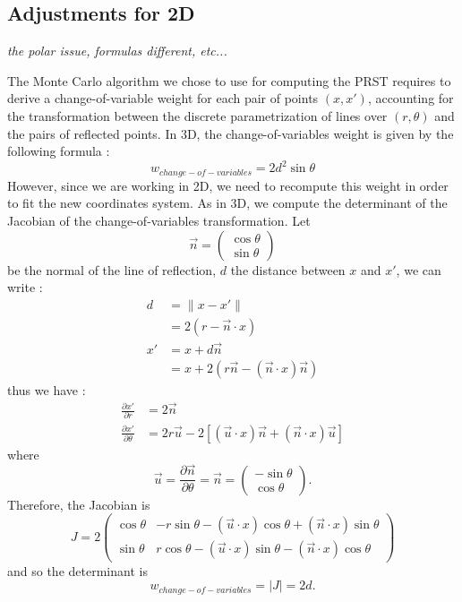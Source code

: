 \documentclass[10pt,a4paper]{article}			%
\begin{document}
	\subsection{Adjustments for 2D}
	
\textit{	the polar issue, formulas different, etc...\\}

The Monte Carlo algorithm we chose to use for computing the PRST requires to derive a change-of-variable weight for each pair of points $(x,x')$, accounting for the transformation between the discrete parametrization of lines over $(r,\theta)$ and the pairs of reflected points. In 3D, the change-of-variables weight is given by the following formula :
\[w_{change-of-variables} = 2d^2\sin\theta\]
However, since we are working in 2D, we need to recompute this weight in order to fit the new coordinates system. As in 3D, we compute the determinant of the Jacobian of the change-of-variables transformation. Let 
\[\vec{n}=\begin{pmatrix}\cos\theta \\ \sin\theta\end{pmatrix}\]
be the normal of the line of reflection, $d$ the distance between $x$ and $x'$, we can write :
\begin{align*}
 d & = \lVert x-x' \rVert  \\
& = 2(r-\vec{n}\cdot x) \\
x' &= x+ d\vec{n}\\
&= x+ 2(r\vec{n} - (\vec{n}\cdot x)\vec{n})
\end{align*}
thus we have :
\begin{align*}
\frac{\partial x'}{\partial r}&=2\vec{n}\\
\frac{\partial x'}{\partial \theta}&= 2r\vec{u}-2[(\vec{u}\cdot x)\vec{n}+(\vec{n}\cdot x)\vec{u}]
\end{align*}
where 
\[\vec{u}=\frac{\partial \vec{n}}{\partial \theta} = \vec{n}=\begin{pmatrix}-\sin\theta \\ \cos\theta\end{pmatrix}.\]
Therefore, the Jacobian is
\[J = 2
\begin{pmatrix}
\cos\theta & -r\sin\theta-(\vec{u}\cdot x)\cos\theta+(\vec{n}\cdot x)\sin\theta\\
\sin\theta &  r \cos\theta - (\vec{u}\cdot x)\sin\theta - (\vec{n}\cdot x)\cos\theta
\end{pmatrix}\]
and so the determinant is
\[w_{change-of-variables} = |J| = 2d.\]
\end{document}
